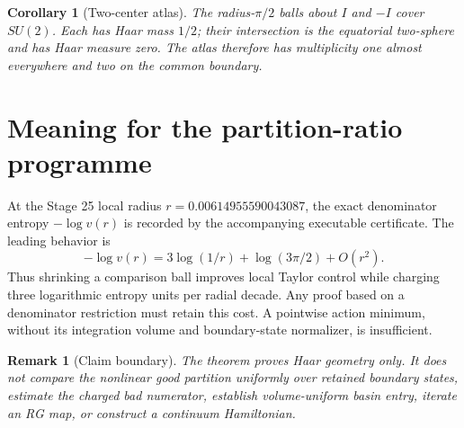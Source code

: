\documentclass[11pt]{article}
\newtheorem{corollary}{Corollary}
\newtheorem{remark}{Remark}
\begin{document}
\begin{corollary}[Two-center atlas]
The radius-$\pi/2$ balls about $I$ and $-I$ cover $SU(2)$.  Each has Haar mass
$1/2$; their intersection is the equatorial two-sphere and has Haar measure
zero.  The atlas therefore has multiplicity one almost everywhere and two on
the common boundary.
\end{corollary}

\section*{Meaning for the partition-ratio programme}
At the Stage 25 local radius $r=0.00614955590043087$, the exact denominator
entropy $-\log v(r)$ is recorded by the accompanying executable certificate.
The leading behavior is
\[
 -\log v(r)=3\log(1/r)+\log(3\pi/2)+O(r^2).
\]
Thus shrinking a comparison ball improves local Taylor control while charging
three logarithmic entropy units per radial decade.  Any proof based on a
denominator restriction must retain this cost.  A pointwise action minimum,
without its integration volume and boundary-state normalizer, is insufficient.

\begin{remark}[Claim boundary]
The theorem proves Haar geometry only.  It does not compare the nonlinear
good partition uniformly over retained boundary states, estimate the charged
bad numerator, establish volume-uniform basin entry, iterate an RG map, or
construct a continuum Hamiltonian.
\end{remark}
\end{document}

